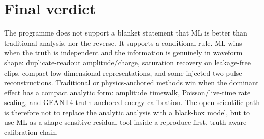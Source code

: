\section{Final verdict}

The programme does not support a blanket statement that ML is better than traditional
analysis, nor the reverse.  It supports a conditional rule.  ML wins when the truth is
independent and the information is genuinely in waveform shape: duplicate-readout
amplitude/charge, saturation recovery on leakage-free clips, compact low-dimensional
representations, and some injected two-pulse reconstructions.  Traditional or
physics-anchored methods win when the dominant effect has a compact analytic form:
amplitude timewalk, Poisson/live-time rate scaling, and GEANT4 truth-anchored energy
calibration.  The open scientific path is therefore not to replace the analytic
analysis with a black-box model, but to use ML as a shape-sensitive residual tool
inside a reproduce-first, truth-aware calibration chain.
